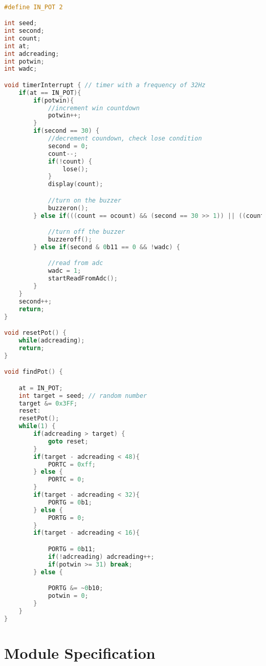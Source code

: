 \documentclass[a4paper]{article}
\begin{document}
\begin{lstlisting}[language=C, caption={Algorithm for \texttt{findPot()}}]

#define IN_POT 2

int seed;
int second;
int count;
int at;
int adcreading;
int potwin;
int wadc;

void timerInterrupt { // timer with a frequency of 32Hz
	if(at == IN_POT){
		if(potwin){
			//increment win countdown
			potwin++;
		}
		if(second == 30) {
			//decrement coundown, check lose condition
			second = 0;
			count--;
			if(!count) {
				lose();
			}
			display(count);

			//turn on the buzzer
			buzzeron();
		} else if(((count == ocount) && (second == 30 >> 1)) || ((count != ocount) && (second == 30 >> 2))) {

			//turn off the buzzer
			buzzeroff();				
		} else if(second & 0b11 == 0 && !wadc) {

			//read from adc
			wadc = 1;
			startReadFromAdc();
		}
	}
	second++;
	return;
}

void resetPot() {
	while(adcreading);
	return;
}

void findPot() {

	at = IN_POT;
	int target = seed; // random number
	target &= 0x3FF;
	reset:
	resetPot();
	while(1) {
		if(adcreading > target) {
			goto reset;
		}
		if(target - adcreading < 48){
			PORTC = 0xff;
		} else {
			PORTC = 0;
		}
		if(target - adcreading < 32){
			PORTG = 0b1;
		} else {
			PORTG = 0;
		}
		if(target - adcreading < 16){

			PORTG = 0b11;
			if(!adcreading) adcreading++;
			if(potwin >= 31) break;
		} else {

			PORTG &= ~0b10;
			potwin = 0;
		}
	}
}

\end{lstlisting}

\section{Module Specification}
\end{document}
